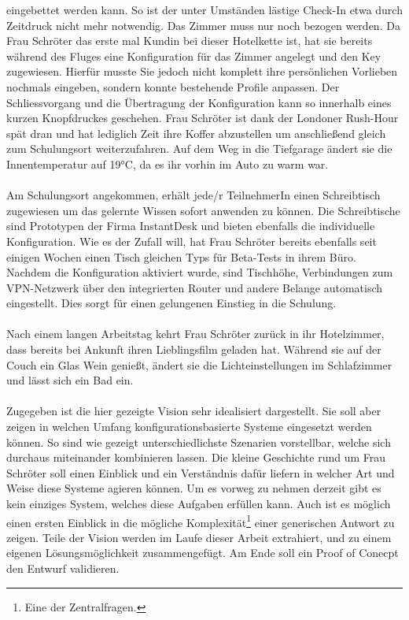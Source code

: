 eingebettet werden kann. So ist der unter Umständen lästige Check-In etwa durch Zeitdruck nicht mehr notwendig. Das Zimmer muss nur noch bezogen werden. Da Frau Schröter das
erste mal Kundin bei dieser Hotelkette ist, hat sie bereits während des Fluges eine Konfiguration für das Zimmer angelegt und den Key zugewiesen. Hierfür musste Sie jedoch 
nicht komplett ihre persönlichen Vorlieben nochmals eingeben, sondern konnte bestehende Profile anpassen. Der Schliessvorgang und die Übertragung der Konfiguration kann so 
innerhalb eines kurzen Knopfdruckes geschehen. Frau Schröter ist dank der Londoner Rush-Hour spät dran und hat lediglich Zeit ihre Koffer abzustellen um anschließend gleich
zum Schulungsort weiterzufahren. Auf dem Weg in die Tiefgarage ändert sie die Innentemperatur auf 19°C, da es ihr vorhin im Auto zu warm war. 
\\\\
Am Schulungsort angekommen, erhält jede/r TeilnehmerIn einen Schreibtisch zugewiesen um das gelernte Wissen sofort anwenden zu können. Die Schreibtische sind Prototypen der
Firma InstantDesk und bieten ebenfalls die individuelle Konfiguration. Wie es der Zufall will, hat Frau Schröter bereits ebenfalls seit einigen Wochen einen Tisch gleichen
Typs für Beta-Tests in ihrem Büro. Nachdem die Konfiguration aktiviert wurde, sind Tischhöhe, Verbindungen zum VPN-Netzwerk über den integrierten Router und andere 
Belange automatisch eingestellt. Dies sorgt für einen gelungenen Einstieg in die Schulung. 
\\\\
Nach einem langen Arbeitstag kehrt Frau Schröter zurück in ihr Hotelzimmer, dass bereits bei Ankunft ihren Lieblingsfilm geladen hat. Während sie auf der Couch ein Glas Wein 
genießt, ändert sie die Lichteinstellungen im Schlafzimmer und lässt sich ein Bad ein. 
\\\\
Zugegeben ist die hier gezeigte Vision sehr idealisiert dargestellt. Sie soll aber zeigen in welchen Umfang konfigurationsbasierte Systeme eingesetzt werden können. So sind 
wie gezeigt unterschiedlichste Szenarien vorstellbar, welche sich durchaus miteinander kombinieren lassen. Die kleine Geschichte rund um Frau Schröter soll einen Einblick und 
ein Verständnis dafür liefern in welcher Art und Weise diese Systeme agieren können.  
Um es vorweg zu nehmen derzeit gibt es kein einziges System, welches diese Aufgaben erfüllen kann. Auch ist es möglich einen ersten Einblick in die mögliche 
Komplexität\footnote{Eine der Zentralfragen.} einer generischen Antwort zu zeigen. 
Teile der Vision werden im Laufe dieser Arbeit extrahiert, und zu einem eigenen Lösungsmöglichkeit zusammengefügt. Am Ende soll ein Proof of Conecpt den Entwurf validieren. 

